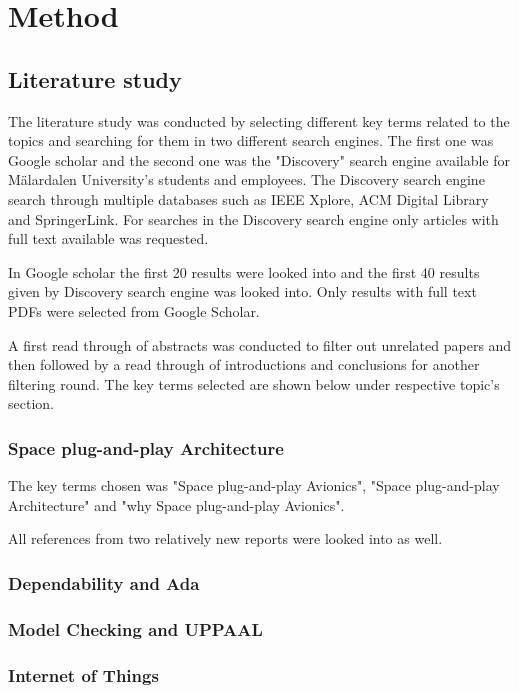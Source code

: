 \chapter{Method}\label{ch:method}
\section{Literature study}
The literature study was conducted by selecting different key terms related to
the topics and searching for them in two different search engines. The first
one was Google scholar and the second one was the "Discovery" search engine
available for Mälardalen University's students and employees. The Discovery
search engine search through multiple databases such as IEEE Xplore,
ACM Digital Library and SpringerLink. For searches in the Discovery search
engine only articles with full text available was requested.

In Google scholar the first 20 results were looked into and the first 40
results given by Discovery search engine was looked into. Only results with
full text PDFs were selected from Google Scholar.

A first read through of abstracts was conducted to filter out unrelated
papers and then followed by a read through of introductions and conclusions for
another filtering round. The key terms selected are shown below under
respective topic's section.

\subsection{Space plug-and-play Architecture}
The key terms chosen was "Space plug-and-play Avionics", "Space
plug-and-play Architecture" and "why Space plug-and-play Avionics".

All references from two relatively new reports were looked into as well.


\subsection{Dependability and Ada}
\subsection{Model Checking and UPPAAL}
\subsection{Internet of Things}

